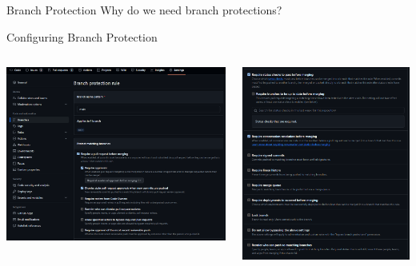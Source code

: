 \documentclass[aspectratio=169]{beamer}
\begin{document}
\begin{frame}{Branch Protection}
    Why do we need branch protections?
\end{frame}
\begin{frame}{Configuring Branch Protection}
    \begin{columns}
        \begin{column}{0.5\textwidth}
            \includegraphics[width=\textwidth,height=0.8\textheight,keepaspectratio]{branch_protection_1.png}
        \end{column}
        \begin{column}{0.5\textwidth}
            \includegraphics[width=\textwidth,height=0.8\textheight,keepaspectratio]{branch_protection_2.png}
        \end{column}
    \end{columns}
    \centering
\end{frame}
\end{document}
